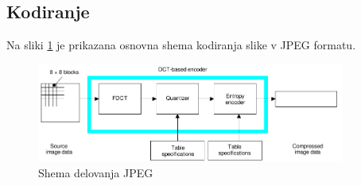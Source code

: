 \documentclass[a4paper,12pt,openright]{book}
\begin{document}
\subsection{Kodiranje}

Na sliki \ref{Shema_JPEG} je prikazana osnovna shema kodiranja slike v JPEG formatu.
\begin{figure}[ht] %
\begin{center}
\includegraphics[width=0.9\textwidth]{slike/Shema_JPEG.pdf}
\end{center}
\caption{Shema delovanja JPEG}
\label{Shema_JPEG}
\end{figure}
\end{document}
